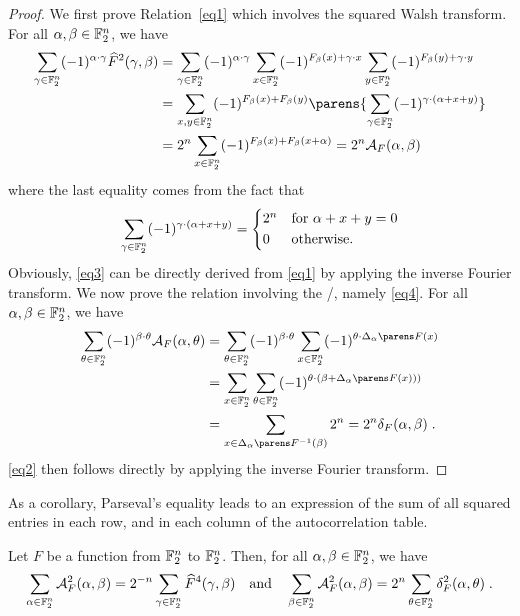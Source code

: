 \begin{proof}
    We first prove Relation~\eqref{eq1} which involves the squared Walsh transform.
    For all $\alpha,\beta \in \mathbb{F}_2^n$, we have
    \begin{align*}
        \sum_{\gamma \in \F_2^n} (-1)^{\iprod{\alpha}{\gamma}} \FC{F}^2(\gamma,\beta)
        &= \sum_{\gamma \in \F_2^n} (-1)^{\iprod{\alpha}{\gamma}}  \sum_{x \in \F_2^n} (-1)^{F_\beta(x) + \iprod{\gamma}{x}} \sum_{y \in \F_2^n} (-1)^{F_\beta(y) + \iprod{\gamma}{y}} \\
        &= \sum_{x,y \in \F_2^n} (-1)^{F_\beta(x)+F_\beta(y)} \parens{\sum_{\gamma \in \F_2^n} (-1)^{\iprod{\gamma}{(\alpha+x+y)}}}\\
        &= 2^n \sum_{x \in \F_2^n} (-1)^{F_\beta(x)+F_\beta(x+\alpha)} = 2^n \AC{F}(\alpha,\beta)
    \end{align*}
    where the last equality comes from the fact that
    \begin{equation*}
        \sum_{\gamma \in \F_2^n} (-1)^{\iprod{\gamma}{(\alpha+x+y)}} = \begin{cases*}
            2^n & for $\alpha+x+y = 0$\\
            0   & otherwise.
        \end{cases*}
    \end{equation*}
    Obviously, \cref{eq3} can be directly derived from \cref{eq1} by applying the inverse Fourier transform.
    We now prove the relation involving the \DDT/, namely \cref{eq4}.
    For all $\alpha,\beta \in \mathbb{F}_2^n$, we have
    \begin{align*}
        \sum_{\theta \in \F_2^n} (-1)^{\iprod{\beta}{\theta}} \AC{F}(\alpha,\theta)
        &= \sum_{\theta \in \F_2^n} (-1)^{\iprod{\beta}{\theta}} \sum_{x \in \F_2^n} (-1)^{\iprod{\theta}{\derive{\alpha}{F}(x)}}\\
        &= \sum_{x \in \F_2^n} \sum_{\theta \in \F_2^n} (-1)^{\iprod{\theta}{(\beta + \derive{\alpha}{F}(x)))}}\\
        &= \sum_{x \in \derive{\alpha}{F}^{-1}(\beta)} 2^n = 2^n \DC{F}(\alpha,\beta)\;.
    \end{align*}
    \cref{eq2} then follows directly by applying the inverse Fourier transform.
\end{proof}

As a corollary, Parseval's equality leads to an expression of the sum of all squared entries in each row, and in each column of the autocorrelation table.

\begin{corollary}\label{cor:Parseval}
    Let $F$ be a function from $\mathbb{F}_2^n$ to $\mathbb{F}_2^n$.
    Then, for all $\alpha,\beta \in \mathbb{F}_2^n$, we have
    \begin{equation*}
        \sum_{\alpha \in \mathbb{F}_2^n} \mathcal{A}_{F}^2(\alpha,\beta) = 2^{-n} \sum_{\gamma \in \mathbb{F}_2^n} \widehat{F}^4(\gamma,\beta) \quad \text{and} \quad \sum_{\beta \in \mathbb{F}_2^n} \mathcal{A}_{F}^2(\alpha,\beta) = 2^n \sum_{\theta \in \mathbb{F}_2^n} \delta_{F}^2(\alpha,\theta)\;.
    \end{equation*}
\end{corollary}

